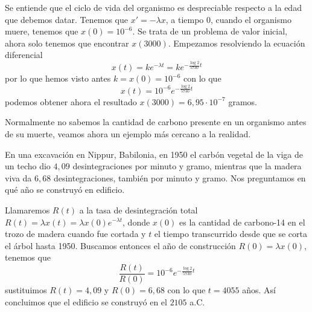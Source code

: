 \documentclass[../main.tex]{subfiles}
\begin{document}
\begin{solution}
	Se entiende que el ciclo de vida del organismo
	es despreciable respecto a la edad que debemos datar. Tenemos que
	\(x' = -\lambda x\), a tiempo \(0\), cuando el organismo muere, tenemos que
	\(x(0) = 10^{-6}\). Se trata de un problema de valor inicial, ahora solo tenemos
	que encontrar \(x(3000)\). Empezamos resolviendo la ecuación diferencial
	\[x(t) = k e^{-\lambda t} = k e^{-\frac{\log 2}{5730} t}\]
	por lo que hemos visto antes \(k = x(0) = 10^{-6}\) con lo que
	\[x(t) = 10^{-6} e^{-\frac{\log 2}{5730} t}\]
	podemos obtener ahora el resultado \(x(3000) = 6,95 \cdot 10^{-7}\) gramos.
\end{solution}

Normalmente no sabemos la cantidad de carbono presente en un organismo antes de
su muerte, veamos ahora un ejemplo más cercano a la realidad.

\begin{example}
	En una excavación en Nippur, Babilonia, en 1950 el carbón vegetal de la viga
	de un techo dio \(4,09\) desintegraciones por minuto y gramo, mientras que
	la madera viva da \(6,68\) desintegraciones, también por minuto y gramo.
	Nos preguntamos en qué año se construyó en edificio.
\end{example}

\begin{solution}
	Llamaremos \(R(t)\) a la tasa de desintegración total
	\(R(t) = \lambda x(t) = \lambda x(0) e^{-\lambda t}\), donde \(x(0)\) es la
	cantidad de carbono-14 en el trozo de madera cuando fue cortada y \(t\) el
	tiempo transcurrido desde que se corta el árbol hasta 1950. Buscamos entonces
	el año de construcción \(R(0) = \lambda x(0)\), tenemos que
	\[\frac{R(t)}{R(0)} = 10^{-6} e^{-\frac{\log 2}{5730} t}\]
	sustituimos \(R(t) = 4,09\) y \(R(0) = 6,68\) con lo que \(t = 4055\) años. Así
	concluimos que el edificio se construyó en el \(2105\) a.C.
\end{solution}
\end{document}

